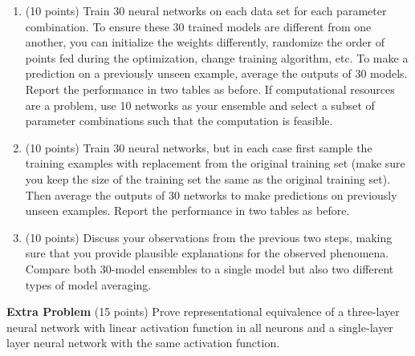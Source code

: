 \documentclass[twoside]{article}
\begin{document}
\begin{enumerate}
\item (10 points) Train 30 neural networks on each data set for each parameter combination. To ensure these 30 trained models are different from one another, you can initialize the weights differently, randomize the order of points fed during the optimization, change training algorithm, etc. To make a prediction on a previously unseen example, average the outputs of 30 models. Report the performance in two tables as before. If computational resources are a problem, use 10 networks as your ensemble and select a subset of parameter combinations such that the computation is feasible.
\item (10 points) Train 30 neural networks, but in each case first sample the training examples with replacement from the original training set (make sure you keep the size of the training set the same as the original training set). Then average the outputs of 30 networks to make predictions on previously unseen examples. Report the performance in two tables as before.
\item (10 points) Discuss your observations from the previous two steps, making sure that you provide plausible explanations for the observed phenomena. Compare both 30-model ensembles to a single model but also two different types of model averaging.
\end{enumerate}


\textbf{Extra Problem} (15 points) Prove representational equivalence of a three-layer neural network with linear activation function in all neurons and a single-layer layer neural network with the same activation function.


\end{document}
